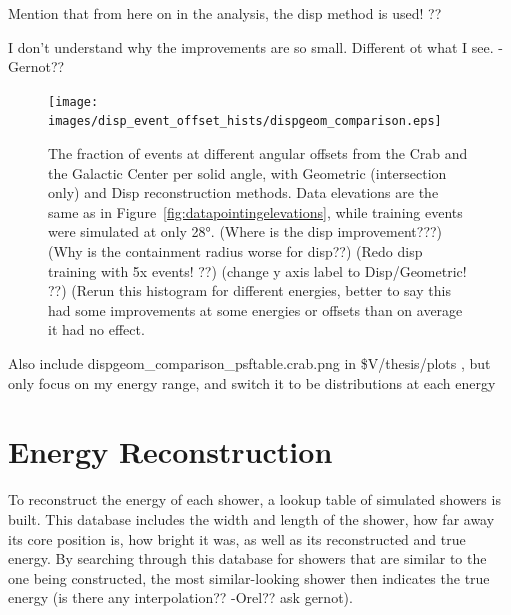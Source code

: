     {\color{red} Mention that from here on in the analysis, the disp method is used! ??}
  
    {\color{red}I don't understand why the improvements are so small.  Different ot what I see. -Gernot?? }

    \begin{figure}[ht]
      \centering
      \texttt{[image: images/disp\_event\_offset\_hists/dispgeom\_comparison.eps]}
      \caption[DISP Offset Improvement]{
        The fraction of events at different angular offsets from the Crab and the Galactic Center per solid angle, with Geometric (intersection only) and Disp reconstruction methods.
        Data elevations are the same as in Figure~\ref{fig:datapointingelevations}, while training events were simulated at only \ang{28}.
        {\color{red}(Where is the disp improvement???)}
        {\color{red}(Why is the containment radius worse for disp??)}
        {\color{red}(Redo disp training with 5x events! ??)}
        {\color{red}(change y axis label to Disp/Geometric! ??)}
        {\color{red}(Rerun this histogram for different energies, better to say this had some improvements at some energies or offsets than on average it had no effect.}
      }
      \label{fig:disp_event_offset}
    \end{figure}
  
  {\color{red}Also include dispgeom\_comparison\_psftable.crab.png in \$V/thesis/plots , but only focus on my energy range, and switch it to be distributions at each energy}

  \FloatBarrier

\section{Energy Reconstruction}\label{subsec:enrecon}
  To reconstruct the energy of each shower, a lookup table of simulated showers is built.
This database includes the width and length of the shower, how far away its core position is, how bright it was, as well as its reconstructed and true energy.
  By searching through this database for showers that are similar to the one being constructed, the most similar-looking shower then indicates the true energy {\color{red} (is there any interpolation?? -Orel?? ask gernot)}.


